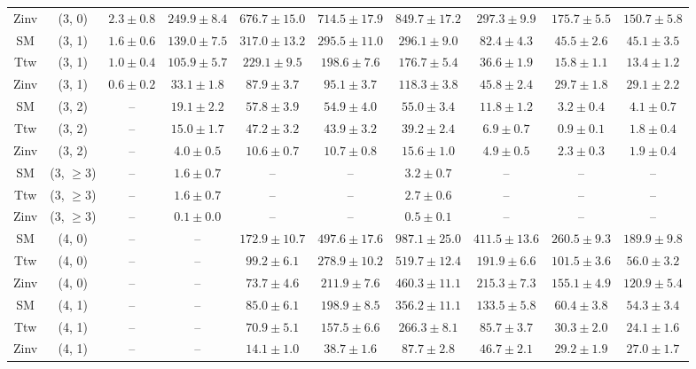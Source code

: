 \begin{table}[h!]
{\begin{tabular}{cccccccccc}
	Zinv & (3, 0) & $2.3\pm 0.8$ & $249.9\pm 8.4$ & $676.7\pm 15.0$ & $714.5\pm 17.9$ & $849.7\pm 17.2$ & $297.3\pm 9.9$ & $175.7\pm 5.5$ & $150.7\pm 5.8$ \\[0.5ex] 
	SM & (3, 1) & $1.6\pm 0.6$ & $139.0\pm 7.5$ & $317.0\pm 13.2$ & $295.5\pm 11.0$ & $296.1\pm 9.0$ & $82.4\pm 4.3$ & $45.5\pm 2.6$ & $45.1\pm 3.5$ \\[0.5ex] 
	Ttw & (3, 1) & $1.0\pm 0.4$ & $105.9\pm 5.7$ & $229.1\pm 9.5$ & $198.6\pm 7.6$ & $176.7\pm 5.4$ & $36.6\pm 1.9$ & $15.8\pm 1.1$ & $13.4\pm 1.2$ \\[0.5ex] 
	Zinv & (3, 1) & $0.6\pm 0.2$ & $33.1\pm 1.8$ & $87.9\pm 3.7$ & $95.1\pm 3.7$ & $118.3\pm 3.8$ & $45.8\pm 2.4$ & $29.7\pm 1.8$ & $29.1\pm 2.2$ \\[0.5ex] 
	SM & (3, 2) & -- & $19.1\pm 2.2$ & $57.8\pm 3.9$ & $54.9\pm 4.0$ & $55.0\pm 3.4$ & $11.8\pm 1.2$ & $3.2\pm 0.4$ & $4.1\pm 0.7$ \\[0.5ex] 
	Ttw & (3, 2) & -- & $15.0\pm 1.7$ & $47.2\pm 3.2$ & $43.9\pm 3.2$ & $39.2\pm 2.4$ & $6.9\pm 0.7$ & $0.9\pm 0.1$ & $1.8\pm 0.4$ \\[0.5ex] 
	Zinv & (3, 2) & -- & $4.0\pm 0.5$ & $10.6\pm 0.7$ & $10.7\pm 0.8$ & $15.6\pm 1.0$ & $4.9\pm 0.5$ & $2.3\pm 0.3$ & $1.9\pm 0.4$ \\[0.5ex] 
	SM & (3, $\ge3$) & -- & $1.6\pm 0.7$ & -- & -- & $3.2\pm 0.7$ & -- & -- & -- \\[0.5ex] 
	Ttw & (3, $\ge3$) & -- & $1.6\pm 0.7$ & -- & -- & $2.7\pm 0.6$ & -- & -- & -- \\[0.5ex] 
	Zinv & (3, $\ge3$) & -- & $0.1\pm 0.0$ & -- & -- & $0.5\pm 0.1$ & -- & -- & -- \\[0.5ex] 
	SM & (4, 0) & -- & -- & $172.9\pm 10.7$ & $497.6\pm 17.6$ & $987.1\pm 25.0$ & $411.5\pm 13.6$ & $260.5\pm 9.3$ & $189.9\pm 9.8$ \\[0.5ex] 
	Ttw & (4, 0) & -- & -- & $99.2\pm 6.1$ & $278.9\pm 10.2$ & $519.7\pm 12.4$ & $191.9\pm 6.6$ & $101.5\pm 3.6$ & $56.0\pm 3.2$ \\[0.5ex] 
	Zinv & (4, 0) & -- & -- & $73.7\pm 4.6$ & $211.9\pm 7.6$ & $460.3\pm 11.1$ & $215.3\pm 7.3$ & $155.1\pm 4.9$ & $120.9\pm 5.4$ \\[0.5ex] 
	SM & (4, 1) & -- & -- & $85.0\pm 6.1$ & $198.9\pm 8.5$ & $356.2\pm 11.1$ & $133.5\pm 5.8$ & $60.4\pm 3.8$ & $54.3\pm 3.4$ \\[0.5ex] 
	Ttw & (4, 1) & -- & -- & $70.9\pm 5.1$ & $157.5\pm 6.6$ & $266.3\pm 8.1$ & $85.7\pm 3.7$ & $30.3\pm 2.0$ & $24.1\pm 1.6$ \\[0.5ex] 
	Zinv & (4, 1) & -- & -- & $14.1\pm 1.0$ & $38.7\pm 1.6$ & $87.7\pm 2.8$ & $46.7\pm 2.1$ & $29.2\pm 1.9$ & $27.0\pm 1.7$ \\[0.5ex] 

\end{tabular}}
\end{table}
